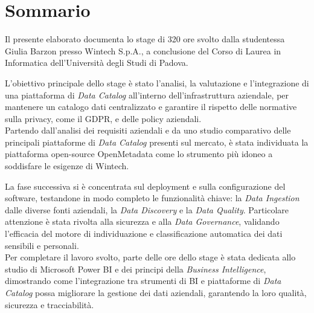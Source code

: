 
\cleardoublepage
{}
{}
\begingroup
\let\clearpage\relax
\let\cleardoublepage\relax
\let\cleardoublepage\relax

\chapter*{Sommario}
Il presente elaborato documenta lo stage di 320 ore svolto dalla studentessa Giulia Barzon presso Wintech S.p.A., a conclusione del Corso di Laurea in Informatica dell'Università degli Studi di Padova.

L'obiettivo principale dello stage è stato l'analisi, la valutazione e l'integrazione di una piattaforma di \textit{Data Catalog} all'interno dell'infrastruttura aziendale, 
per mantenere un catalogo dati centralizzato e garantire il rispetto delle normative sulla privacy, come il GDPR, e delle policy aziendali.\\

Partendo dall'analisi dei requisiti aziendali e da uno studio comparativo delle principali piattaforme di \textit{Data Catalog} 
presenti sul mercato, è stata individuata la piattaforma open-source OpenMetadata come lo strumento più idoneo a soddisfare le esigenze di Wintech.

La fase successiva si è concentrata sul deployment e sulla configurazione del software, testandone in modo completo le funzionalità chiave: la \textit{Data Ingestion} 
dalle diverse fonti aziendali, la \textit{Data Discovery} e la \textit{Data Quality}. 
Particolare attenzione è stata rivolta alla sicurezza e alla \textit{Data Governance}, validando l'efficacia del motore di individuazione e classificazione automatica dei dati sensibili e personali.\\

Per completare il lavoro svolto, parte delle ore dello stage è stata dedicata allo studio di Microsoft Power BI e dei principi della \textit{Business Intelligence}, 
dimostrando come l'integrazione tra strumenti di BI e piattaforme di \textit{Data Catalog} possa migliorare la gestione dei dati aziendali, garantendo la loro qualità, sicurezza e tracciabilità.




\endgroup

\vfill
